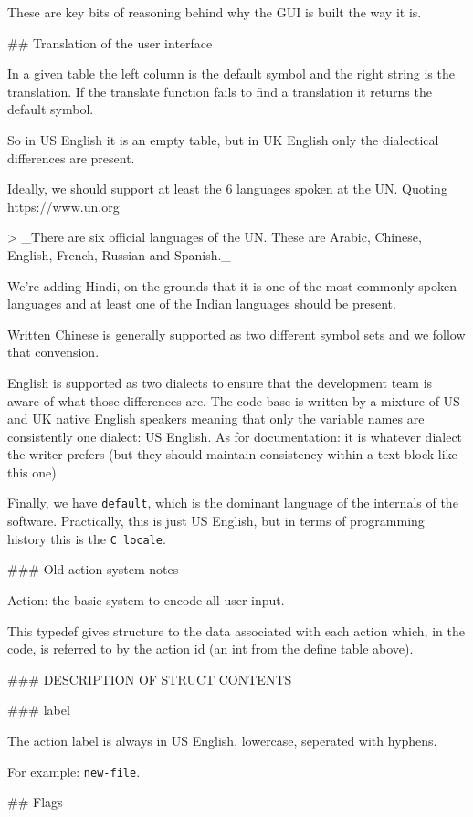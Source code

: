 These are key bits of reasoning behind why the GUI is built the way it is.

## Translation of the user interface

In a given table the left column is the default symbol and the right string is the translation.
If the translate function fails to find a translation it returns the default symbol.

So in US English it is an empty table, but in UK English
only the dialectical differences are present.

Ideally, we should support at least the 6 languages spoken at the UN. Quoting
https://www.un.org

> _There are six official languages of the UN. These are Arabic, Chinese, English, French, Russian and Spanish._

We're adding Hindi, on the grounds that it is one of the most commonly spoken languages and at
least one of the Indian languages should be present.

Written Chinese is generally supported as two different symbol sets and we follow that
convension.

English is supported as two dialects to ensure that the development team is aware of what those
differences are. The code base is written by a mixture of US and UK native English speakers
meaning that only the variable names are consistently one dialect: US English. As for
documentation: it is whatever dialect the writer prefers (but they should maintain consistency
within a text block like this one).

Finally, we have \texttt{default}, which is the dominant language
of the internals of the software. Practically, this is
just US English, but in terms of programming history this
is the \texttt{C locale}.

### Old action system notes

Action: the basic system to encode all user input.

This typedef gives structure to the data associated with each action
which, in the code, is referred to by the action id (an int from
the define table above).

### DESCRIPTION OF STRUCT CONTENTS

### label

The action label is always in US English, lowercase,
seperated with hyphens.

For example: \texttt{new-file}.

## Flags

